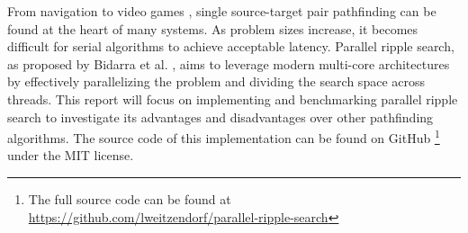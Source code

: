 From navigation to video games \cite{GMaps}, single source-target pair pathfinding can be found at the heart of many systems. 
As problem sizes increase, it becomes difficult for serial algorithms to achieve acceptable latency. 
Parallel ripple search, as proposed by Bidarra et al. \cite{PRS}, aims to leverage modern multi-core architectures by effectively parallelizing the problem and dividing the search space across threads. 
This report will focus on implementing and benchmarking parallel ripple search to investigate its advantages and disadvantages over other pathfinding algorithms.
The source code of this implementation can be found on GitHub
\footnote{The full source code can be found at \url{https://github.com/lweitzendorf/parallel-ripple-search}}
under the MIT license.